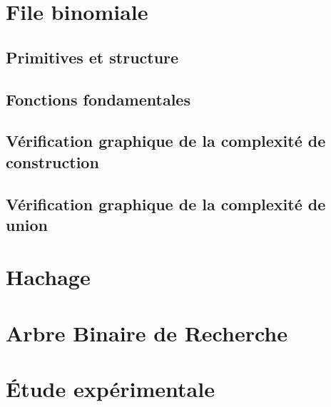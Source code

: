 \documentclass[12pt,a4paper]{article}
\begin{document}
\section{File binomiale}

\subsection{Primitives et structure}

\subsection{Fonctions fondamentales}

\subsection{Vérification graphique de la complexité de construction}

\subsection{Vérification graphique de la complexité de union}


\section{Hachage}

\section{Arbre Binaire de Recherche}

\section{Étude expérimentale}



\cleardoublepage



\nocite{*}
\end{document}
